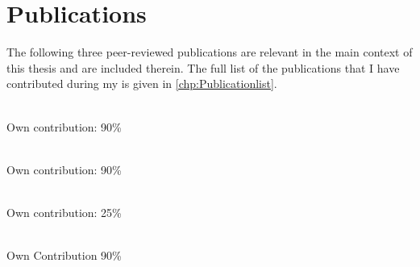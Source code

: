 \noindent
 
\chapter*{Publications}


The following three peer-reviewed publications are relevant in the main context of this thesis and are included therein. The full list of the publications that I have contributed during my is given in \autoref{chp:Publicationlist}.\\


\noindent{}\\ \strut \hfill Own contribution: 90\%\\

\noindent{}\\ \strut \hfill Own contribution: 90\%\\

\noindent{}\\ \strut \hfill Own contribution: 25\%\\
\noindent{}\\ \strut \hfill Own Contribution 90\%\\



